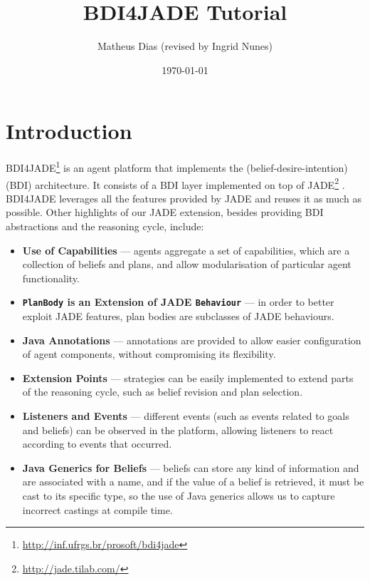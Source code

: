 \documentclass{article}
\title{BDI4JADE Tutorial}
\author{Matheus Dias (revised by Ingrid Nunes)}
\date{\today}
\begin{document}
\maketitle

\tableofcontents

\newpage

\section{Introduction}\label{sec:introduction}

BDI4JADE\footnote{\url{http://inf.ufrgs.br/prosoft/bdi4jade}} is an agent platform that implements the (belief-desire-intention) (BDI) \cite{Rao:AAMAS1995:BDIArch} architecture. It consists of a BDI layer implemented on top of JADE\footnote{\url{http://jade.tilab.com/}} \cite{Bellifemine:book2007:JADE}. BDI4JADE leverages all the features provided by JADE and reuses it as much as possible. Other highlights of our JADE extension, besides providing BDI abstractions and the reasoning cycle, include:

\begin{itemize}

    \item \textbf{Use of Capabilities} --- agents aggregate a set of capabilities, which are a collection of beliefs and plans, and allow modularisation of particular agent functionality.

    \item \textbf{\texttt{PlanBody} is an Extension of JADE \texttt{Behaviour}} --- in order to better exploit JADE features, plan bodies are subclasses of JADE behaviours.

    \item \textbf{Java Annotations} --- annotations are provided to allow easier configuration of agent components, without compromising its flexibility.

    \item \textbf{Extension Points} --- strategies can be easily implemented to extend parts of the reasoning cycle, such as  belief revision and plan selection.

    \item \textbf{Listeners and Events} --- different events (such as events related to goals and beliefs) can be observed in the platform, allowing listeners to react according to events that occurred.

    \item \textbf{Java Generics for Beliefs} --- beliefs can store any kind of information and are associated with a name, and if the value of a belief is retrieved, it must be cast to its specific type, so the use of Java generics allows us to capture incorrect castings at compile time.

\end{itemize}
\end{document}
